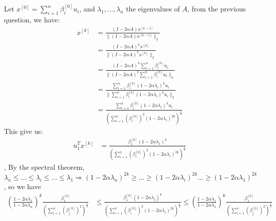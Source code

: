 \documentclass[12pt,twoside]{article}
\begin{document}
\begin{enumerate}
\begin{enumerate}
Let $x^{[0]} = \sum_{i=1}^n \beta_i^{[0]} u_i$,  and $\lambda_1, \dots , \lambda_n$ the eigenvalues of $A$, from the previous question, we have:
\begin{align*}
	x^{[k]}	&=	\frac{(I - 2 \alpha A)  x^{[k-1]}} { \| (I - 2 \alpha A)  x^{[k-1]} \|_2} \\
			&=	\frac{(I - 2 \alpha A)^k x^{[0]}} { \| (I - 2 \alpha A)^k x^{[0]} \|_2 } \\
			&= 	\frac{(I - 2 \alpha A)^k \sum_{i=1}^n \beta_i^{[0]} u_i} { \| (I - 2 \alpha A)^k \sum_{i=1}^n \beta_i^{[0]} u_i \|_2} \\
			&=	\frac{\sum_{i=1}^n \beta_i^{[0]} (1 - 2 \alpha \lambda_i)^k u_i} { \| \sum_{i=1}^n \beta_i^{[0]} (1 - 2 \alpha \lambda_i)^k u_i \|_2} \\
			&= 	\frac{\sum_{i=1}^n \beta_i^{[0]} (1 - 2 \alpha \lambda_i)^k u_i} { (\sum_{i=1}^n (\beta_i^{[0]})^2 (1 - 2 \alpha \lambda_i)^{2k} )^{\frac{1}{2}} }
\end{align*}
This give us:
\begin{align*}
	u_1^T x^{[k]}	&=	\frac{ \beta_1^{[0]} (1 - 2 \alpha \lambda_1)^k }  { (\sum_{i=1}^n (\beta_i^{[0]})^2 (1 - 2 \alpha \lambda_i)^{2k} )^{\frac{1}{2}} } 
\end{align*}
,
By the spectral theorem, $\lambda_n \le \dots \le \lambda_i \le \ldots \le \lambda_1 \Rightarrow (1-2 \alpha \lambda_n)^{2k} \ge \ldots \ge (1-2 \alpha \lambda_i)^{2k} \ldots \ge (1-2 \alpha \lambda_1)^{2k}$, so we have
\begin{align*}
	(\frac{1-2 \alpha \lambda_1}{1-2 \alpha \lambda_n})^k \frac{\beta_1^{[0]}} {(\sum_{i=1}^n (\beta_j^{[0]})^2)^{\frac{1}{2}}} 
		&\le \frac{ \beta_1^{[0]} (1 - 2 \alpha \lambda_j)^k }  { (\sum_{i=1}^n (\beta_i^{[0]})^2 (1 - 2 \alpha \lambda_i)^{2k} )^{\frac{1}{2}} } 
		\le (\frac{1-2 \alpha \lambda_1}{1-2 \alpha \lambda_1})^k \frac{\beta_1^{[0]}} {(\sum_{i=1}^n (\beta_j^{[0]})^2)^{\frac{1}{2}}} \\

\end{align*}
\end{enumerate}
\end{enumerate}
\end{document}
